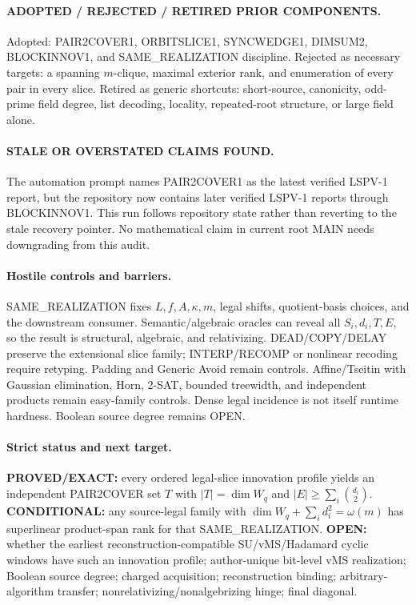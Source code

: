 \documentclass[11pt]{article}
\begin{document}
\paragraph{ADOPTED / REJECTED / RETIRED PRIOR COMPONENTS.}
Adopted: PAIR2COVER1, ORBITSLICE1, SYNCWEDGE1, DIMSUM2, BLOCKINNOV1, and SAME\_REALIZATION discipline.
Rejected as necessary targets: a spanning $m$-clique, maximal exterior rank, and enumeration of every pair in every slice.
Retired as generic shortcuts: short-source, canonicity, odd-prime field degree, list decoding, locality, repeated-root structure, or large field alone.

\paragraph{STALE OR OVERSTATED CLAIMS FOUND.}
The automation prompt names PAIR2COVER1 as the latest verified LSPV-1 report, but the repository now contains later verified LSPV-1 reports through BLOCKINNOV1. This run follows repository state rather than reverting to the stale recovery pointer. No mathematical claim in current root MAIN needs downgrading from this audit.

\paragraph{Hostile controls and barriers.}
SAME\_REALIZATION fixes $L,f,A,\kappa,m$, legal shifts, quotient-basis choices, and the downstream consumer. Semantic/algebraic oracles can reveal all $S_i,d_i,T,E$, so the result is structural, algebraic, and relativizing. DEAD/COPY/DELAY preserve the extensional slice family; INTERP/RECOMP or nonlinear recoding require retyping. Padding and Generic Avoid remain controls. Affine/Tseitin with Gaussian elimination, Horn, 2-SAT, bounded treewidth, and independent products remain easy-family controls. Dense legal incidence is not itself runtime hardness. Boolean source degree remains OPEN.

\paragraph{Strict status and next target.}
\textbf{PROVED/EXACT:} every ordered legal-slice innovation profile yields an independent PAIR2COVER set $T$ with $|T|=\dim W_q$ and $|E|\ge\sum_i\binom{d_i}{2}$.
\textbf{CONDITIONAL:} any source-legal family with $\dim W_q+\sum_i d_i^2=\omega(m)$ has superlinear product-span rank for that SAME\_REALIZATION.
\textbf{OPEN:} whether the earliest reconstruction-compatible SU/vMS/Hadamard cyclic windows have such an innovation profile; author-unique bit-level vMS realization; Boolean source degree; charged acquisition; reconstruction binding; arbitrary-algorithm transfer; nonrelativizing/nonalgebrizing hinge; final diagonal.
\end{document}
